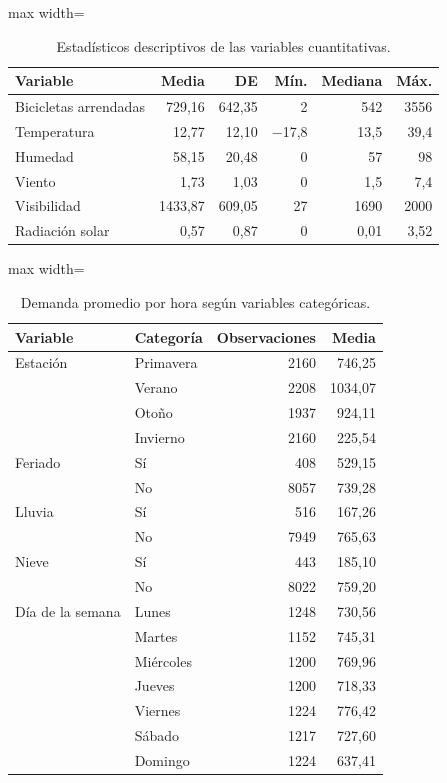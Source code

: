 \documentclass[12pt, a4paper]{article}
\numberwithin{equation}{section}
\begin{document}
\begin{table}[htbp]
\centering
\small
\caption{Estadísticos descriptivos de las variables cuantitativas.}
\begin{adjustbox}{max width=\linewidth}
\begin{tabular}{lrrrrr}
\toprule
Variable & Media & DE & Mín. & Mediana & Máx. \\
\midrule
Bicicletas arrendadas & 729{,}16 & 642{,}35 & 2 & 542 & 3556 \\
Temperatura & 12{,}77 & 12{,}10 & $-$17{,}8 & 13{,}5 & 39{,}4 \\
Humedad & 58{,}15 & 20{,}48 & 0 & 57 & 98 \\
Viento & 1{,}73 & 1{,}03 & 0 & 1{,}5 & 7{,}4 \\
Visibilidad & 1433{,}87 & 609{,}05 & 27 & 1690 & 2000 \\
Radiación solar & 0{,}57 & 0{,}87 & 0 & 0{,}01 & 3{,}52 \\
\bottomrule
\end{tabular}
\end{adjustbox}
\label{tab:descriptivos}
\end{table}

\begin{table}[htbp]
\centering
\small
\caption{Demanda promedio por hora según variables categóricas.}
\begin{adjustbox}{max width=\linewidth}
\begin{tabular}{llrr}
\toprule
Variable & Categoría & Observaciones & Media \\
\midrule
Estación & Primavera & 2160 & 746{,}25 \\
         & Verano    & 2208 & 1034{,}07 \\
         & Otoño     & 1937 & 924{,}11 \\
         & Invierno  & 2160 & 225{,}54 \\
\midrule
Feriado  & Sí & 408  & 529{,}15 \\
         & No & 8057 & 739{,}28 \\
\midrule
Lluvia   & Sí & 516  & 167{,}26 \\
         & No & 7949 & 765{,}63 \\
\midrule
Nieve    & Sí & 443  & 185{,}10 \\
         & No & 8022 & 759{,}20 \\
\midrule
Día de la semana & Lunes     & 1248 & 730{,}56 \\
                 & Martes    & 1152 & 745{,}31 \\
                 & Miércoles & 1200 & 769{,}96 \\
                 & Jueves    & 1200 & 718{,}33 \\
                 & Viernes   & 1224 & 776{,}42 \\
                 & Sábado    & 1217 & 727{,}60 \\
                 & Domingo   & 1224 & 637{,}41 \\
\bottomrule
\end{tabular}
\end{adjustbox}
\label{tab:categoricas}
\end{table}
\end{document}
